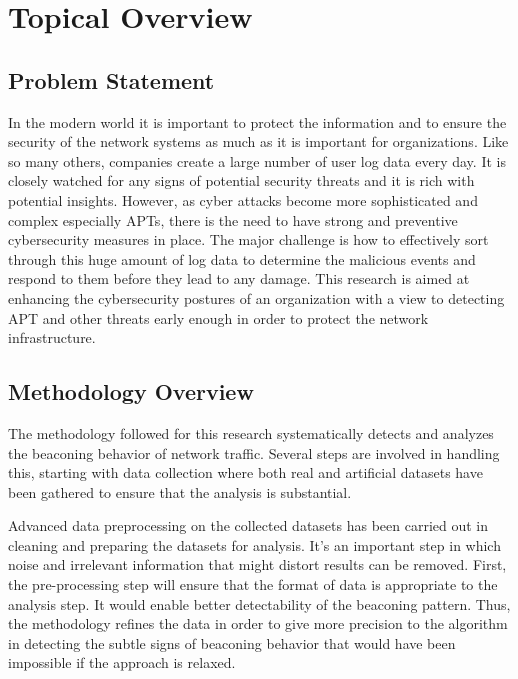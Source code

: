 \chapter{Topical Overview}

\section{Problem Statement}
In the modern world it is important to protect the information and to ensure the security of the network systems as much as it is important for organizations. Like so many others, companies create a large number of user log data every day. It is closely watched for any signs of potential security threats and it is rich with potential insights. However, as cyber attacks become more sophisticated and complex especially APTs, there is the need to have strong and preventive cybersecurity measures in place. The major challenge is how to effectively sort through this huge amount of log data to determine the malicious events and respond to them before they lead to any damage. This research is aimed at enhancing the cybersecurity postures of an organization with a view to detecting APT and other threats early enough in order to protect the network infrastructure.
\section{Methodology Overview}
The methodology followed for this research systematically detects and analyzes the beaconing behavior of network traffic. Several steps are involved in handling this, starting with data collection where both real and artificial datasets have been gathered to ensure that the analysis is substantial.

Advanced data preprocessing on the collected datasets has been carried out in cleaning and preparing the datasets for analysis. It's an important step in which noise and irrelevant information that might distort results can be removed. First, the pre-processing step will ensure that the format of data is appropriate to the analysis step. It would enable better detectability of the beaconing pattern. Thus, the methodology refines the data in order to give more precision to the algorithm in detecting the subtle signs of beaconing behavior that would have been impossible if the approach is relaxed.


